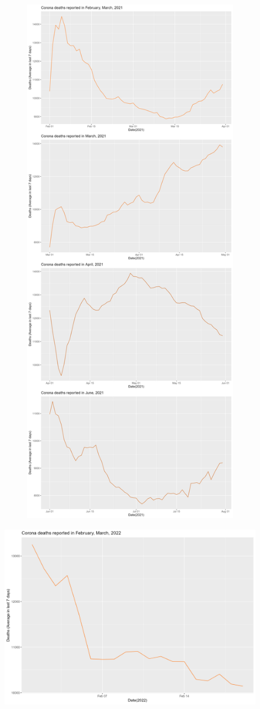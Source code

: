 \documentclass[a4paper]{article}
\theoremstyle{definition}
\begin{document}
\begin{enumerate}[i)]
\begin{enumerate}[1)]
\begin{figure}[H]
				\includegraphics[height=23cm,width=13cm]{images/8.4.2.png}
			\end{figure}
			\begin{figure}[H]
				\centering
				\includegraphics[scale=0.2]{images/8.4.3.png}

\end{figure}
\end{enumerate}
\end{enumerate}
\end{document}
